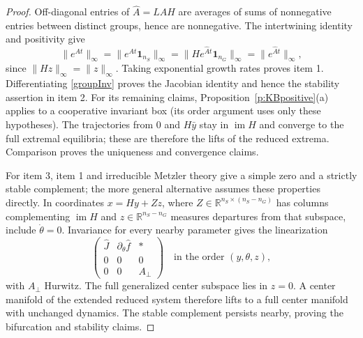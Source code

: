 \begin{proof}
Off-diagonal entries of $\widehat A=LAH$ are averages of sums of
nonnegative entries between distinct groups, hence are nonnegative.
The intertwining identity and positivity give
\[
 \|e^{At}\|_\infty=\|e^{At}\mathbf1_{n_S}\|_\infty
 =\|He^{\widehat A t}\mathbf1_{n_G}\|_\infty
 =\|e^{\widehat A t}\|_\infty,
\]
since $\|Hz\|_\infty=\|z\|_\infty$. Taking exponential growth rates
proves item 1. Differentiating \eqref{groupInv} proves the
Jacobian identity and hence the stability assertion in item 2.
For its remaining claims, Proposition~\ref{p:KBpositive}(a) applies
to a cooperative invariant box (its order argument uses only these
hypotheses). The trajectories from $0$ and $H\bar y$ stay in
$\operatorname{im}H$ and converge to the full extremal equilibria;
these are therefore the lifts of the reduced extrema. Comparison
proves the uniqueness and convergence claims.

For item 3, item 1 and irreducible Metzler theory give a simple zero
and a strictly stable complement; the more general alternative
assumes these properties directly. In coordinates $x=Hy+Zz$,
where $Z\in\mathbb R^{n_S\times(n_S-n_G)}$ has columns
complementing $\operatorname{im}H$ and
$z\in\mathbb R^{n_S-n_G}$ measures departures from that subspace, include
$\dot\theta=0$. Invariance for every nearby parameter gives the
linearization
\[
 \begin{pmatrix}
 \widehat J&\partial_\theta\widehat f&*\\
 0&0&0\\
 0&0&A_\perp
 \end{pmatrix}
 \quad\text{in the order }(y,\theta,z),
\]
with $A_\perp$ Hurwitz. The full generalized center subspace lies
in $z=0$. A center manifold of the extended reduced system therefore
lifts to a full center manifold with unchanged dynamics. The stable
complement persists nearby, proving the bifurcation and stability
claims.
\end{proof}


